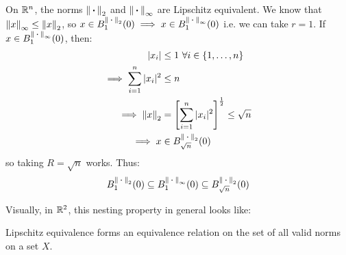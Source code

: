 \documentclass[../main.tex]{subfiles}
\begin{document}
\begin{example}
  On $\R^{n}$, the norms $\norm{\argdot}_2$ and $\norm{\argdot}_{\infty}$ are Lipschitz equivalent.
  We know that $\norm{x}_{\infty} \leq \norm{x}_{2}$, so $x \in B^{\norm{\argdot}_{2}}_1(0) \implies x \in B^{\norm{\argdot}_{\infty}}_1(0)$ i.e. we can take $r = 1$.
  If $x \in B^{\norm{\argdot}_{\infty}}_1(0)$, then:
  \begin{align*}
    |x_i| &\leq 1\ \forall i \in \{1, \ldots, n\} \\
    \implies \sum_{i = 1}^{n} |x_i|^2 &\leq n \\
    \implies \norm{x}_{2} &= \left[\sum_{i = 1}^{n} |x_i|^2\right]^{\frac{1}{2}} \leq \sqrt{n} \\
    \implies x &\in B^{\norm{\argdot}_2}_{\sqrt{n}}(0)
  \end{align*}
  so taking $R = \sqrt{n}$ works.
  Thus:
  \[
    B^{\norm{\argdot}_{2}}_{1}(0) \subseteq B^{\norm{\argdot}_{\infty}}_1(0) \subseteq B^{\norm{\argdot}_{2}}_{\sqrt{n}}(0)
  \]

  Visually, in $\R^2$, this nesting property in general looks like:
  \begin{center}
  \end{center}
\end{example}
\begin{lemma}
  Lipschitz equivalence forms an equivalence relation on the set of all valid norms on a set $X$. \label{lipRelation}
\end{lemma}
\end{document}

